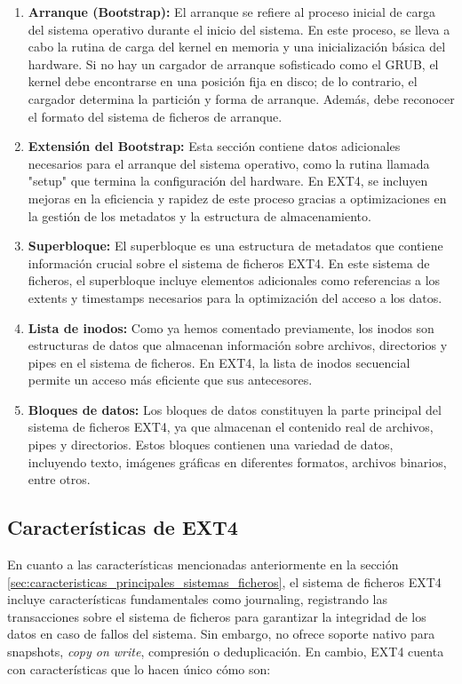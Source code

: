 \begin{enumerate}
    \item \textbf{Arranque (Bootstrap):} El arranque se refiere al proceso inicial de carga del sistema operativo durante el inicio del sistema. En este proceso, se lleva a cabo la rutina de carga del kernel en memoria y una inicialización básica del hardware. Si no hay un cargador de arranque sofisticado como el GRUB, el kernel debe encontrarse en una posición fija en disco; de lo contrario, el cargador determina la partición y forma de arranque. Además, debe reconocer el formato del sistema de ficheros de arranque.

    \item \textbf{Extensión del Bootstrap:} Esta sección contiene datos adicionales necesarios para el arranque del sistema operativo, como la rutina llamada "setup" que termina la configuración del hardware. En EXT4, se incluyen mejoras en la eficiencia y rapidez de este proceso gracias a optimizaciones en la gestión de los metadatos y la estructura de almacenamiento.

    \item \textbf{Superbloque:} El superbloque es una estructura de metadatos que contiene información crucial sobre el sistema de ficheros EXT4. En este sistema de ficheros, el superbloque incluye elementos adicionales como referencias a los extents y timestamps necesarios para la optimización del acceso a los datos.
    
    \item \textbf{Lista de inodos:} Como ya hemos comentado previamente, los inodos son estructuras de datos que almacenan información sobre archivos, directorios y pipes en el sistema de ficheros. En EXT4, la lista de inodos secuencial permite un acceso más eficiente que sus antecesores.
    
    \item \textbf{Bloques de datos:} Los bloques de datos constituyen la parte principal del sistema de ficheros EXT4, ya que almacenan el contenido real de archivos, pipes y directorios. Estos bloques contienen una variedad de datos, incluyendo texto, imágenes gráficas en diferentes formatos, archivos binarios, entre otros.
\end{enumerate}

\subsection{Características de EXT4}

En cuanto a las características mencionadas anteriormente en la sección \ref{sec:caracteristicas_principales_sistemas_ficheros}, el sistema de ficheros EXT4 incluye características fundamentales como journaling, registrando las transacciones sobre el sistema de ficheros para garantizar la integridad de los datos en caso de fallos del sistema. Sin embargo, no ofrece soporte nativo para snapshots, \textit{copy on write}, compresión o deduplicación. En cambio, EXT4 cuenta con características que lo hacen único cómo son:

